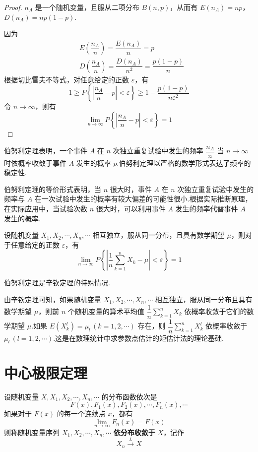 \begin{proof}
    $n_A$ 是一个随机变量，且服从二项分布 $B(n,p)$，从而有 $E(n_A) = np$，$D(n_A) = np(1-p)$.

    因为
    $$
    \begin{aligned}
        & E(\dfrac{n_A}{n}) = \dfrac{E(n_A)}{n} = p \\
        & D(\dfrac{n_A}{n}) = \dfrac{D(n_A)}{n^2} = \dfrac{p(1-p)}{n}
    \end{aligned}
    $$
    根据切比雪夫不等式，对任意给定的正数 $\varepsilon$，有
    $$
    1 \geqslant P \left\{ \left| \dfrac{n_A}{n} - p \right| < \varepsilon \right\} \geqslant 1 - \dfrac{p(1-p)}{n \varepsilon^2}
    $$
    令 $n \to \infty$，则有
    $$
    \lim_{n \to \infty} P \left\{ \left| \dfrac{n_A}{n} - p \right| < \varepsilon \right\} = 1
    $$
\end{proof}

伯努利定理表明，一个事件 $A$ 在 $n$ 次独立重复试验中发生的频率 $\dfrac{n_A}{n}$ 当 $n \to \infty$ 时依概率收敛于事件 $A$ 发生的概率 $p$.伯努利定理以严格的数学形式表达了频率的稳定性.

伯努利定理的等价形式表明，当 $n$ 很大时，事件 $A$ 在 $n$ 次独立重复试验中发生的频率与 $A$ 在一次试验中发生的概率有较大偏差的可能性很小.根据实际推断原理，在实际应用中，当试验次数 $n$ 很大时，可以利用事件 $A$ 发生的频率代替事件 $A$ 发生的概率.

\begin{theorem}[][辛钦定理]
    设随机变量 $X_1,X_2,\cdots,X_n,\cdots$ 相互独立，服从同一分布，且具有数学期望 $\mu$，则对于任意给定的正数 $\varepsilon$，有
    $$
    \lim_{n \to \infty} P \left\{ \left| \dfrac{1}{n} \sum_{k=1}^n X_k - \mu \right| < \varepsilon \right\} = 1
    $$
\end{theorem}

伯努利定理是辛钦定理的特殊情况.

由辛钦定理可知，如果随机变量 $X_1,X_2,\cdots,X_n,\cdots$ 相互独立，服从同一分布且具有数学期望 $\mu$，则前 $n$ 个随机变量的算术平均值 $\dfrac{1}{n} \displaystyle\sum_{k=1}^n X_k$ 依概率收敛于它们的数学期望 $\mu$.如果 $E(X_k^l) = \mu_l \, (k=1,2,\cdots)$ 存在，则 $\dfrac{1}{n} \displaystyle\sum_{k=1}^n X_k^l$ 依概率收敛于 $\mu_l \, (l=1,2,\cdots)$.这是在数理统计中求参数点估计的矩估计法的理论基础.

\section{中心极限定理}

\begin{definition} \label{def: 依分布收敛}
    设随机变量 $X,X_1,X_2,\cdots,X_n,\cdots$ 的分布函数依次是
    $$
    F(x),F_1(x),F_2(x),\cdots,F_n(x),\cdots
    $$
    如果对于 $F(x)$ 的每一个连续点 $x$，都有
    $$
    \lim_{n \to \infty} F_n(x) = F(x)
    $$
    则称随机变量序列 $X_1,X_2,\cdots,X_n,\cdots$ \textbf{依分布收敛于} $X$，记作
    $$
    X_n \overset{L}{\longrightarrow} X
    $$
\end{definition}

